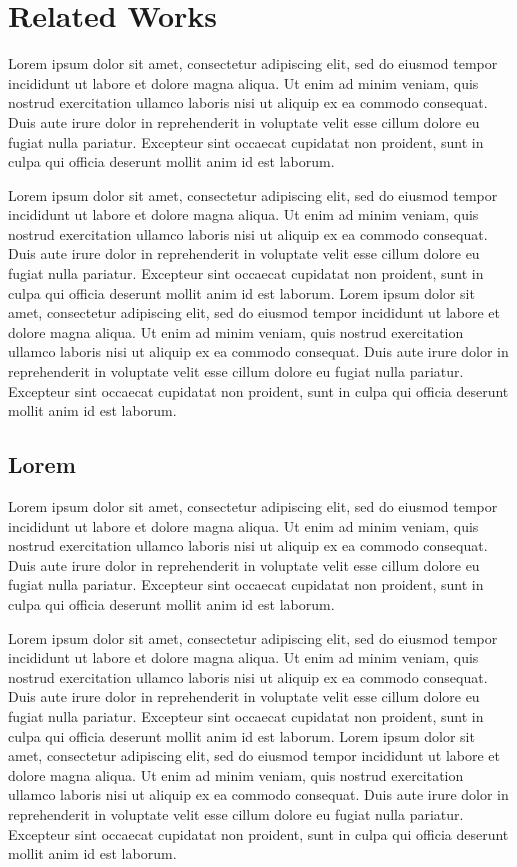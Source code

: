 \chapter{Related Works}
  Lorem ipsum dolor sit amet, consectetur adipiscing elit, sed do eiusmod tempor
  incididunt ut labore et dolore magna aliqua. Ut enim ad minim veniam, quis
  nostrud exercitation ullamco laboris nisi ut aliquip ex ea commodo consequat.
  Duis aute irure dolor in reprehenderit in voluptate velit esse cillum dolore eu
  fugiat nulla pariatur. Excepteur sint occaecat cupidatat non proident, sunt in
  culpa qui officia deserunt mollit anim id est laborum.

  Lorem ipsum dolor sit amet, consectetur adipiscing elit, sed do eiusmod tempor
  incididunt ut labore et dolore magna aliqua. Ut enim ad minim veniam, quis
  nostrud exercitation ullamco laboris nisi ut aliquip ex ea commodo consequat.
  Duis aute irure dolor in reprehenderit in voluptate velit esse cillum dolore eu
  fugiat nulla pariatur. Excepteur sint occaecat cupidatat non proident, sunt in
  culpa qui officia deserunt mollit anim id est laborum.
  Lorem ipsum dolor sit amet, consectetur adipiscing elit, sed do eiusmod tempor
  incididunt ut labore et dolore magna aliqua. Ut enim ad minim veniam, quis
  nostrud exercitation ullamco laboris nisi ut aliquip ex ea commodo consequat.
  Duis aute irure dolor in reprehenderit in voluptate velit esse cillum dolore eu
  fugiat nulla pariatur. Excepteur sint occaecat cupidatat non proident, sunt in
  culpa qui officia deserunt mollit anim id est laborum.

\section{Lorem}
  Lorem ipsum dolor sit amet, consectetur adipiscing elit, sed do eiusmod tempor
  incididunt ut labore et dolore magna aliqua. Ut enim ad minim veniam, quis
  nostrud exercitation ullamco laboris nisi ut aliquip ex ea commodo consequat.
  Duis aute irure dolor in reprehenderit in voluptate velit esse cillum dolore eu
  fugiat nulla pariatur. Excepteur sint occaecat cupidatat non proident, sunt in
  culpa qui officia deserunt mollit anim id est laborum.

  Lorem ipsum dolor sit amet, consectetur adipiscing elit, sed do eiusmod tempor
  incididunt ut labore et dolore magna aliqua. Ut enim ad minim veniam, quis
  nostrud exercitation ullamco laboris nisi ut aliquip ex ea commodo consequat.
  Duis aute irure dolor in reprehenderit in voluptate velit esse cillum dolore eu
  fugiat nulla pariatur. Excepteur sint occaecat cupidatat non proident, sunt in
  culpa qui officia deserunt mollit anim id est laborum.
  Lorem ipsum dolor sit amet, consectetur adipiscing elit, sed do eiusmod tempor
  incididunt ut labore et dolore magna aliqua. Ut enim ad minim veniam, quis
  nostrud exercitation ullamco laboris nisi ut aliquip ex ea commodo consequat.
  Duis aute irure dolor in reprehenderit in voluptate velit esse cillum dolore eu
  fugiat nulla pariatur. Excepteur sint occaecat cupidatat non proident, sunt in
  culpa qui officia deserunt mollit anim id est laborum.

